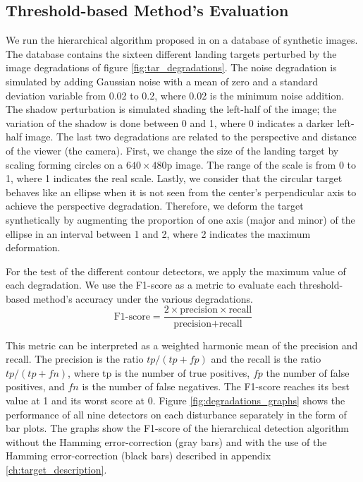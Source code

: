 \subsection{Threshold-based Method's Evaluation}
We run the hierarchical algorithm proposed in \citep{BaquedanoA.:ESIEE:2017} on a database of synthetic images. The database contains the sixteen different landing targets perturbed by the image degradations of figure \ref{fig:tar_degradations}. The noise degradation is simulated by adding Gaussian noise with a mean of zero and a standard deviation variable from 0.02 to 0.2, where 0.02 is the minimum noise addition. The shadow perturbation is simulated shading the left-half of the image; the variation of the shadow is done between 0 and 1, where 0 indicates a darker left-half image. The last two degradations are related to the perspective and distance of the viewer (the camera). First, we change the size of the landing target by scaling forming circles on a $640\times480$p image. The range of the scale is from 0 to 1, where 1 indicates the real scale. Lastly, we consider that the circular target behaves like an ellipse when it is not seen from the center's perpendicular axis to achieve the perspective degradation. Therefore, we deform the target synthetically by augmenting the proportion of one axis (major and minor) of the ellipse in an interval between 1 and 2, where 2 indicates the maximum deformation. 

For the test of the different contour detectors, we apply the maximum value of each degradation. We use the F1-score as a metric to evaluate each threshold-based method's accuracy under the various degradations.
\begin{equation}\label{eq:f1_score}
    \text{F1-score} = \frac{2 \times \text{precision}\times\text{recall}}{\text{precision} + \text{recall}}
\end{equation}

This metric can be interpreted as a weighted harmonic mean of the precision and recall. The precision is the ratio $tp / (tp + fp)$ and the recall is the ratio $tp / (tp + fn)$, where tp is the number of true positives, $fp$ the number of false positives, and $fn$ is the number of false negatives. The F1-score reaches its best value at 1 and its worst score at 0. Figure \ref{fig:degradations_graphs} shows the performance of all nine detectors on each disturbance separately in the form of bar plots. The graphs show the F1-score of the hierarchical detection algorithm without the Hamming error-correction (gray bars) and with the use of the Hamming error-correction (black bars) described in appendix \ref{ch:target_description}.

